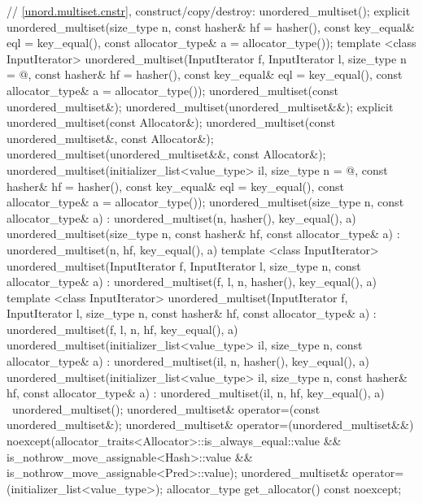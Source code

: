 \begin{codeblock}
{{    // \ref{unord.multiset.cnstr}, construct/copy/destroy:
    unordered_multiset();
    explicit unordered_multiset(size_type n,
                                const hasher& hf = hasher(),
                                const key_equal& eql = key_equal(),
                                const allocator_type& a = allocator_type());
    template <class InputIterator>
      unordered_multiset(InputIterator f, InputIterator l,
                         size_type n = @\seebelow@,
                         const hasher& hf = hasher(),
                         const key_equal& eql = key_equal(),
                         const allocator_type& a = allocator_type());
    unordered_multiset(const unordered_multiset&);
    unordered_multiset(unordered_multiset&&);
    explicit unordered_multiset(const Allocator&);
    unordered_multiset(const unordered_multiset&, const Allocator&);
    unordered_multiset(unordered_multiset&&, const Allocator&);
    unordered_multiset(initializer_list<value_type> il,
                       size_type n = @\seebelow@,
                       const hasher& hf = hasher(),
                       const key_equal& eql = key_equal(),
                       const allocator_type& a = allocator_type());
    unordered_multiset(size_type n, const allocator_type& a)
      : unordered_multiset(n, hasher(), key_equal(), a) { }
    unordered_multiset(size_type n, const hasher& hf, const allocator_type& a)
      : unordered_multiset(n, hf, key_equal(), a) { }
    template <class InputIterator>
      unordered_multiset(InputIterator f, InputIterator l, size_type n, const allocator_type& a)
        : unordered_multiset(f, l, n, hasher(), key_equal(), a) { }
    template <class InputIterator>
      unordered_multiset(InputIterator f, InputIterator l, size_type n, const hasher& hf, 
                         const allocator_type& a)
      : unordered_multiset(f, l, n, hf, key_equal(), a) { }
    unordered_multiset(initializer_list<value_type> il, size_type n, const allocator_type& a)
      : unordered_multiset(il, n, hasher(), key_equal(), a) { }
    unordered_multiset(initializer_list<value_type> il, size_type n, const hasher& hf, 
                       const allocator_type& a)
      : unordered_multiset(il, n, hf, key_equal(), a) { }
    ~unordered_multiset();
    unordered_multiset& operator=(const unordered_multiset&);
    unordered_multiset& operator=(unordered_multiset&&)
      noexcept(allocator_traits<Allocator>::is_always_equal::value &&
               is_nothrow_move_assignable<Hash>::value &&
               is_nothrow_move_assignable<Pred>::value);
    unordered_multiset& operator=(initializer_list<value_type>);
    allocator_type get_allocator() const noexcept;

}}
\end{codeblock}
